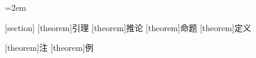\usepackage{indentfirst}
\parindent=2em
\linespread{1.25}

\def\abstractname{摘\quad 要}
\def\contentsname{目录}
\def\proofname{证明}
\def\refname{参考文献}


\theoremstyle{cjk-theorem}
[section]
[theorem]{引理}
[theorem]{推论}
[theorem]{命题}
[theorem]{定义}

\theoremstyle{cjk-definition}
[theorem]{注}
[theorem]{例}
\theoremstyle{cjk-theorem}

\makeatletter
\renewenvironment{proof}[1][\proofname]{\par
    \pushQED{\qed}%
    \normalfont \topsep6\p@\@plus6\p@\relax
    \trivlist
    \item\relax{\bfseries#1}\hspace{1em}\ignorespaces
}{\popQED\endtrivlist\@endpefalse}
\makeatother
